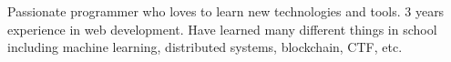

\begin{cvparagraph}

Passionate programmer who loves to learn new technologies and tools. 3 years experience in web development. Have learned many different things in school including machine learning, distributed systems, blockchain, CTF, etc.
\end{cvparagraph}
